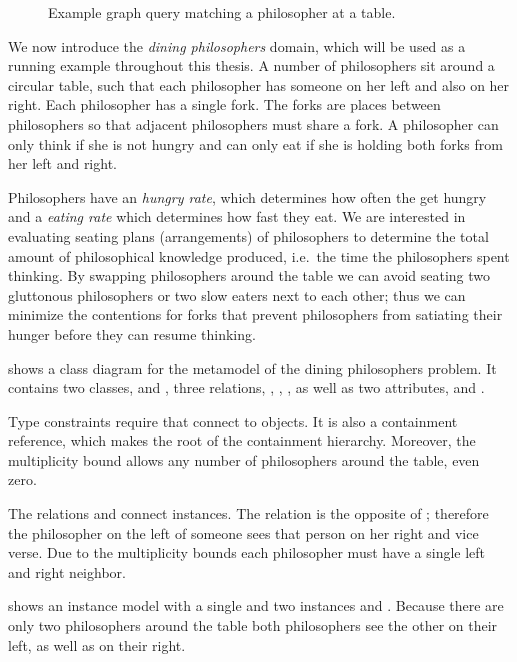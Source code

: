 \begin{figure}
\begin{minipage}[t]{0.3333\textwidth}
    \caption{\protect\RaggedRight Example graph query matching a philosopher at a table.}
    \label{fig:background:pattern}
  \end{minipage}%
\end{figure}

\begin{runningExample}\label{ex:background:running}
  We now introduce the \emph{dining philosophers} domain, which will be used as a running example throughout this thesis. A number of philosophers sit around a circular table, such that each philosopher has someone on her left and also on her right. Each philosopher has a single fork. The forks are places between philosophers so that adjacent philosophers must share a fork. A philosopher can only think if she is not hungry and can only eat if she is holding both forks from her left and right.

  Philosophers have an \emph{hungry rate}, which determines how often the get hungry and a \emph{eating rate} which determines how fast they eat. We are interested in evaluating seating plans (arrangements) of philosophers to determine the total amount of philosophical knowledge produced, i.e.~the time the philosophers spent thinking. By swapping philosophers around the table we can avoid seating two gluttonous philosophers or two slow eaters next to each other; thus we can minimize the contentions for forks that prevent philosophers from satiating their hunger before they can resume thinking.

   shows a class diagram for the metamodel of the dining philosophers problem. It contains two classes,  and , three relations, , , , as well as two attributes,  and .

  Type constraints require that  connect  to  objects. It is also a containment reference, which makes  the root of the containment hierarchy. Moreover, the multiplicity bound \lit{[0..*]} allows any number of philosophers around the table, even zero.

  The relations  and  connect  instances. The relation  is the opposite of ; therefore the philosopher on the left of someone sees that person on her right and vice verse. Due to the multiplicity bounds \lit{[1]} each philosopher must have a single left and right neighbor.

   shows an instance model with a single   and two  instances  and . Because there are only two philosophers around the table both philosophers see the other on their left, as well as on their right.
\end{runningExample}

